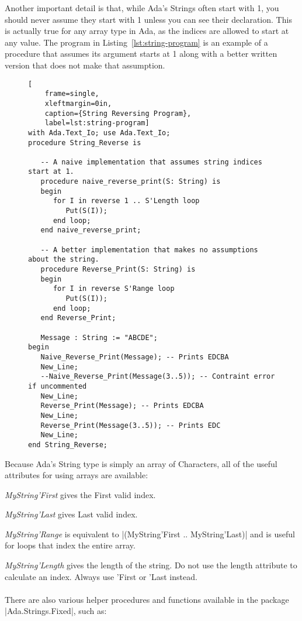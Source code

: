 Another important detail is that, while Ada's Strings often start with 1, you should never
assume they start with 1 unless you can see their declaration. This is actually true for any
array type in Ada, as the indices are allowed to start at any value. The program in
Listing~\ref{lst:string-program} is an example of a procedure that assumes its argument starts
at 1 along with a better written version that does not make that assumption.

\begin{figure}[tbhp]
\begin{lstlisting}[
    frame=single,
    xleftmargin=0in,
    caption={String Reversing Program},
    label=lst:string-program]
with Ada.Text_Io; use Ada.Text_Io;
procedure String_Reverse is

   -- A naive implementation that assumes string indices start at 1.
   procedure naive_reverse_print(S: String) is
   begin
      for I in reverse 1 .. S'Length loop
         Put(S(I));
      end loop;
   end naive_reverse_print;

   -- A better implementation that makes no assumptions about the string.
   procedure Reverse_Print(S: String) is
   begin
      for I in reverse S'Range loop
         Put(S(I));
      end loop;
   end Reverse_Print;

   Message : String := "ABCDE";
begin
   Naive_Reverse_Print(Message); -- Prints EDCBA
   New_Line;
   --Naive_Reverse_Print(Message(3..5)); -- Contraint error if uncommented
   New_Line;
   Reverse_Print(Message); -- Prints EDCBA
   New_Line;
   Reverse_Print(Message(3..5)); -- Prints EDC
   New_Line;
end String_Reverse;   
\end{lstlisting}    
\end{figure}


Because Ada's String type is simply an array of Characters, all of the useful attributes for
using arrays are available:

\emph{MyString'First} gives the First valid index.

\emph{MyString'Last} gives Last valid index.

\emph{MyString'Range} is equivalent to |(MyString'First .. MyString'Last)| and is useful for
loops that index the entire array.

\emph{MyString'Length} gives the length of the string. Do not use the length attribute to
calculate an index. Always use 'First or 'Last instead.
\\\\ %
There are also various helper procedures and functions available in the package
|Ada.Strings.Fixed|, such as:

